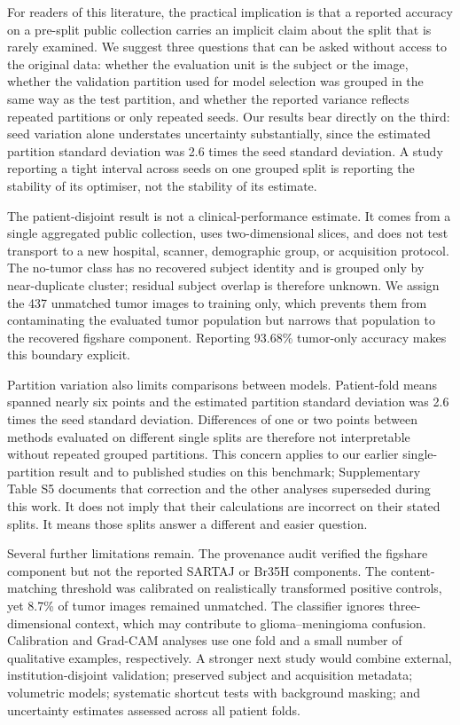 ﻿\documentclass[11pt]{article}
\begin{document}
For readers of this literature, the practical implication is that a reported accuracy on a pre-split public collection carries an implicit claim about the split that is rarely examined. We suggest three questions that can be asked without access to the original data: whether the evaluation unit is the subject or the image, whether the validation partition used for model selection was grouped in the same way as the test partition, and whether the reported variance reflects repeated partitions or only repeated seeds. Our results bear directly on the third: seed variation alone understates uncertainty substantially, since the estimated partition standard deviation was 2.6 times the seed standard deviation. A study reporting a tight interval across seeds on one grouped split is reporting the stability of its optimiser, not the stability of its estimate.

The patient-disjoint result is not a clinical-performance estimate. It comes from a single aggregated public collection, uses two-dimensional slices, and does not test transport to a new hospital, scanner, demographic group, or acquisition protocol. The no-tumor class has no recovered subject identity and is grouped only by near-duplicate cluster; residual subject overlap is therefore unknown. We assign the 437 unmatched tumor images to training only, which prevents them from contaminating the evaluated tumor population but narrows that population to the recovered figshare component. Reporting 93.68\% tumor-only accuracy makes this boundary explicit.

Partition variation also limits comparisons between models. Patient-fold means spanned nearly six points and the estimated partition standard deviation was 2.6 times the seed standard deviation. Differences of one or two points between methods evaluated on different single splits are therefore not interpretable without repeated grouped partitions. This concern applies to our earlier single-partition result and to published studies on this benchmark; Supplementary Table S5 documents that correction and the other analyses superseded during this work. It does not imply that their calculations are incorrect on their stated splits. It means those splits answer a different and easier question.

Several further limitations remain. The provenance audit verified the figshare component but not the reported SARTAJ or Br35H components. The content-matching threshold was calibrated on realistically transformed positive controls, yet 8.7\% of tumor images remained unmatched. The classifier ignores three-dimensional context, which may contribute to glioma--meningioma confusion. Calibration and Grad-CAM analyses use one fold and a small number of qualitative examples, respectively. A stronger next study would combine external, institution-disjoint validation; preserved subject and acquisition metadata; volumetric models; systematic shortcut tests with background masking; and uncertainty estimates assessed across all patient folds.
\end{document}
